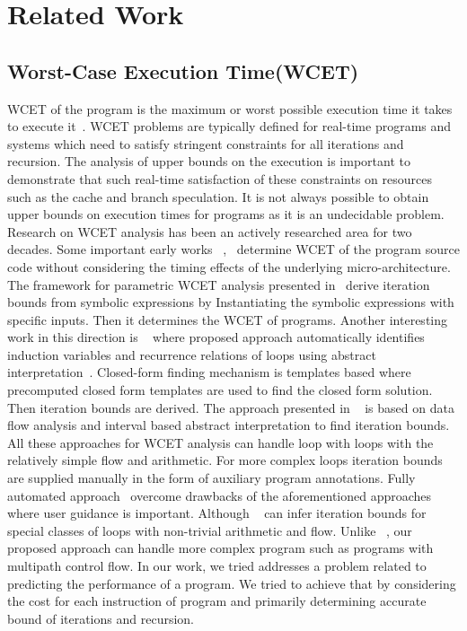 \section{Related Work}
\label{sec:related}

\subsection{Worst-Case Execution Time(WCET)} 
WCET of the program is the maximum or worst possible execution time it takes to execute it~\cite{Wilhelm:2008:WEP:1347375.1347389}. WCET problems are typically defined for real-time programs and systems which need to satisfy stringent constraints for all iterations and recursion.
The analysis of upper bounds on the execution is important to demonstrate that such real-time satisfaction of these constraints on resources such as the cache and branch speculation. It is not always possible to obtain upper bounds on execution times for programs as it is an undecidable problem. Research on WCET analysis has been an actively researched area for two decades. Some important early works ~\cite{Puschner:1989:CME:84842.84850},~\cite{Zhang1993} determine WCET of the program source code without considering the timing effects of the underlying micro-architecture. The framework for parametric WCET analysis presented in~\cite{DBLP:conf/wcet/Lisper03} derive iteration bounds from symbolic expressions by Instantiating the symbolic expressions with speciﬁc inputs. Then it determines the WCET of programs. Another interesting work in this direction is ~\cite{4617284} where proposed approach automatically identiﬁes induction variables and recurrence relations of loops using abstract interpretation~\cite{Ammarguellat:1990:ARI:93542.93583}. Closed-form finding mechanism is templates based where precomputed closed form templates are used to find the closed form solution. Then iteration bounds are derived. The approach presented in ~\cite{Prantltubound} is based on data ﬂow analysis and interval based abstract interpretation to find iteration bounds. All these approaches for WCET analysis can handle loop with loops with the relatively simple flow and arithmetic.
For more complex loops iteration bounds are supplied manually in the form of auxiliary program annotations. Fully automated approach~\cite{Knoop:2011:SLB:2341512.2341532} overcome drawbacks of the aforementioned approaches where user guidance is important. Although ~\cite{Knoop:2011:SLB:2341512.2341532} can infer iteration bounds for special classes of loops with non-trivial arithmetic and flow. Unlike ~\cite{Knoop:2011:SLB:2341512.2341532}, our proposed approach can handle more complex program such as programs with multipath control flow. In our work, we tried addresses a problem related to predicting the performance of a program. We tried to achieve that by considering the cost for each instruction of program and primarily determining accurate bound of iterations and recursion.
